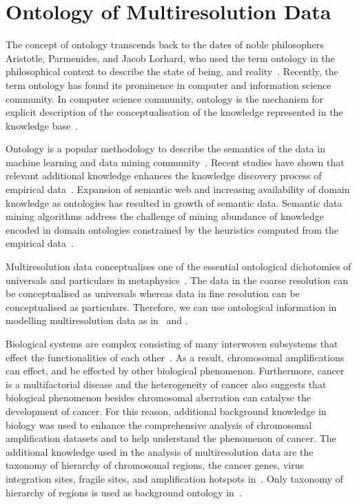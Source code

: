 
\section{Ontology of Multiresolution Data}
\label{s:ontologymulti}

The concept of ontology transcends back to the dates of noble 
philosophers Aristotle, Parmenides, and Jacob Lorhard, who 
used the term ontology in the philosophical context to
describe the state of being, and reality~\cite{cohen2014}.
Recently, the term ontology has found its prominence 
in computer and information science community. 
In computer science community, ontology is 
the mechanism for explicit description of the 
conceptualisation of the knowledge represented in the 
knowledge base~\cite{gruber1993,swartout1996}. 

Ontology is a popular methodology to describe the semantics of the 
data in machine learning and data mining community~\cite{panov2012}. 
Recent studies have shown that relevant additional knowledge enhances 
the knowledge discovery process of empirical data~\cite{panov2012}. 
Expansion of semantic web and increasing 
availability of domain knowledge as  ontologies has resulted
in  growth of semantic data. Semantic data mining algorithms
address the challenge of mining abundance of knowledge 
encoded in domain ontologies constrained by the heuristics 
computed from the empirical data~\cite{Vavpetic13jiis}. 

Multiresolution data conceptualises one of the essential 
ontological dichotomies of universals and particulars
in metaphysics~\cite{so49866,russell1911}. The data
in the coarse resolution can be conceptualised as 
universals whereas data in fine resolution can be 
conceptualised as particulars. Therefore, we 
can use ontological information in modelling 
multiresolution data as in~ and .

Biological systems are complex consisting of many interwoven subsystems that 
effect the functionalities of each other~\cite{kim2003}. As a result, 
chromosomal amplifications can effect, and be effected by other 
biological phenomenon. Furthermore, cancer is a multifactorial 
disease and the heterogeneity of cancer also suggests that biological 
phenomenon besides chromosomal aberration can catalyse the development
of cancer. For this reason, additional background knowledge in biology 
was used to enhance the comprehensive analysis of chromosomal 
amplification datasets and to help understand the phenomenon of cancer. 
The additional knowledge used in the analysis of multiresolution data 
are the taxonomy of hierarchy of chromosomal regions, the cancer genes,  virus 
integration sites, fragile sites, and ampli\-fication hotspots
in~. Only taxonomy of hierarchy of regions is used
as background ontology in~.

